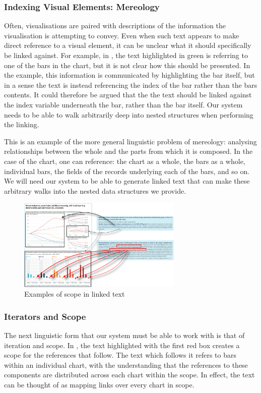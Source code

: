 \subsubsection{Indexing Visual Elements: Mereology}
Often, visualisations are paired with descriptions of the information the visualisation is attempting to
convey. Even when such text appears to make direct reference to a visual element, it can be unclear what 
it should specifically be linked against. For example, in , the text highlighted
in green is referring to one of the bars in the chart, but it is not clear how this should be presented.
In the example, this information is communicated by highlighting the bar itself, but in a sense the text is
instead referencing the index of the bar rather than the bars contents. It could therefore be argued that the
the text should be linked against the index variable underneath the bar, rather than the bar itself.
Our system needs to be able to walk arbitrarily deep into nested structures when performing the linking.

This is an example of the more general linguistic problem of mereology: analysing relationships between the
whole and the parts from which it is composed. In the case of the chart, one can reference: the chart as a whole,
the bars as a whole, individual bars, the fields of the records underlying each of the bars, and so on.
We will need our system to be able to generate linked text that can make these arbitrary walks into the nested
data structures we provide.


\begin{figure}
   \includegraphics[width=0.7\textwidth]{fig/ipcc-visual-elements.png}
   \caption{Examples of scope in linked text}
   \label{fig:visual-element-scope}
\end{figure}

\subsubsection{Iterators and Scope}
The next linguistic form that our system must be able to work with is that of iteration and scope. 
In , the text highlighted with the first red box creates a scope for
the references that follow. The text which follows it refers to bars within an individual chart,
with the understanding that the references to these components are distributed across each chart
within the scope. In effect, the text can be thought of as mapping links over every chart in scope.

